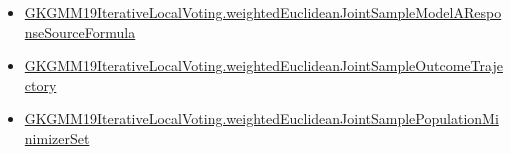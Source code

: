 \documentclass[10pt]{article}
\begin{document}
\begin{itemize}
\item \hyperlink{governing-declaration-ace6ad03cde32709}{GKGMM19\allowbreak{}Iterative\allowbreak{}Local\allowbreak{}Voting.\allowbreak{}weighted\allowbreak{}Euclidean\allowbreak{}Joint\allowbreak{}Sample\allowbreak{}Model\allowbreak{}A\allowbreak{}Response\allowbreak{}Source\allowbreak{}Formula}
\item \hyperlink{governing-declaration-469cdd605e0a0b8a}{GKGMM19\allowbreak{}Iterative\allowbreak{}Local\allowbreak{}Voting.\allowbreak{}weighted\allowbreak{}Euclidean\allowbreak{}Joint\allowbreak{}Sample\allowbreak{}Outcome\allowbreak{}Trajectory}
\item \hyperlink{governing-declaration-ee8d6317650e85b8}{GKGMM19\allowbreak{}Iterative\allowbreak{}Local\allowbreak{}Voting.\allowbreak{}weighted\allowbreak{}Euclidean\allowbreak{}Joint\allowbreak{}Sample\allowbreak{}Population\allowbreak{}Minimizer\allowbreak{}Set}
\end{itemize}
\end{document}
